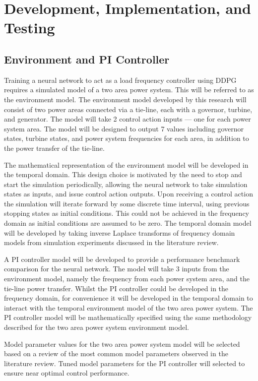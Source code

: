 \section{Development, Implementation, and Testing}
\subsection{Environment and PI Controller}
Training a neural network to act as a load frequency controller using DDPG requires a simulated model of a two area power system. This will be referred to as the environment model. The environment model developed by this research will consist of two power areas connected via a tie-line, each with a governor, turbine, and generator. The model will take 2 control action inputs --- one for each power system area. The model will be designed to output 7 values including governor states, turbine states, and power system frequencies for each area, in addition to the power transfer of the tie-line.

The mathematical representation of the environment model will be developed in the temporal domain. This design choice is motivated by the need to stop and start the simulation periodically, allowing the neural network to take simulation states as inputs, and issue control action outputs. Upon receiving a control action the simulation will iterate forward by some discrete time interval, using previous stopping states as initial conditions. This could not be achieved in the frequency domain as initial conditions are assumed to be zero. The temporal domain model will be developed by taking inverse Laplace transforms of frequency domain models from simulation experiments discussed in the literature review.

A PI controller model will be developed to provide a performance benchmark comparison for the neural network. The model will take 3 inputs from the environment model, namely the frequency from each power system area, and the tie-line power transfer. Whilst the PI controller could be developed in the frequency domain, for convenience it will be developed in the temporal domain to interact with the temporal environment model of the two area power system. The PI controller model will be mathematically specified using the same methodology described for the two area power system environment model.

Model parameter values for the two area power system model will be selected based on a review of the most common model parameters observed in the literature review. Tuned model parameters for the PI controller will selected to ensure near optimal control performance.

